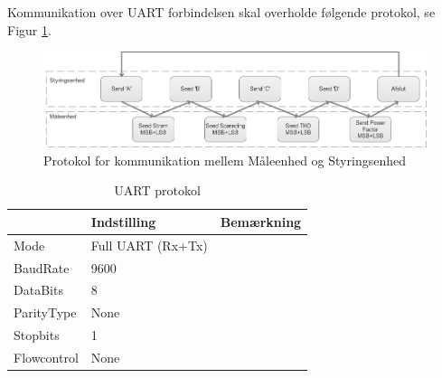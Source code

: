 Kommunikation over UART forbindelsen skal overholde følgende protokol, se Figur \ref{fig:UARTprotokol}.
\begin{figure}[H] %
	\centering
	\includegraphics[width=\textwidth]{Figure/UARTprotokol}
	\caption{Protokol for kommunikation mellem Måleenhed og Styringsenhed}
	\label{fig:UARTprotokol}
\end{figure}

\begin{table}[h]
	\centering
	\caption{UART protokol}
	\label{tab:UARTprotokol}
	\begin{tabular}{@{}lll@{}}
		\toprule
							& Indstilling       		& Bemærkning \\ \midrule
		Mode       		& Full UART (Rx+Tx) &            \\
		BaudRate 	  & 9600             		 &            \\
		DataBits    	& 8             			    &            \\
		ParityType 	  	& None     			         &            \\
		Stopbits    	& 1               				  &            \\
		Flowcontrol 	& None         		     &           \\ \hline
	\end{tabular}
\end{table}
